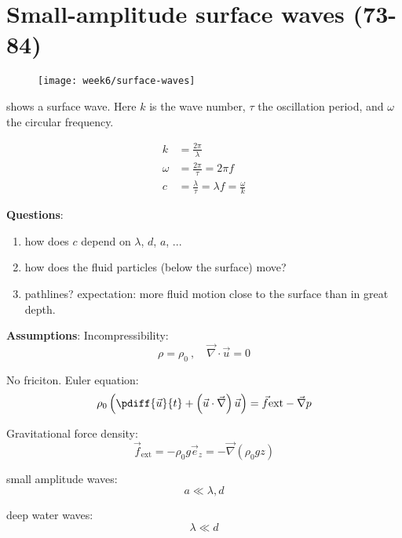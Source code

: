 \section{Small-amplitude surface waves (73-84)}

\begin{figure}[!h]
    \centering
    \texttt{[image: week6/surface-waves]}\\
    \caption{}
    \label{fig:surface-waves}
\end{figure}

 shows a surface wave. Here $k$ is the wave number, $\tau$ the oscillation period, and $\omega$ the circular frequency.

\begin{align}
k &= \frac{2\pi}{\lambda}\\
\omega &= \frac{2\pi}{\tau} = 2\pi f\\
c &= \frac{\lambda}{\tau} = \lambda f = \frac{\omega}{k}
\end{align}

\textbf{Questions}:
\begin{enumerate}
\item how does $c$ depend on $\lambda$, $d$, $a$, ...
\item how does the fluid particles (below the surface) move?
\item pathlines? expectation: more fluid motion close to the surface than in great depth.
\end{enumerate}

\textbf{Assumptions}:
Incompressibility:
\begin{equation}
\rho=\rho_0\ ,\quad \vec{\nabla}\cdot\vec{u}=0
\end{equation}

No friciton. Euler equation:
\begin{equation}
\rho_0\left(\pdiff{\vec{u}}{t}+\left(\vec{u}\cdot\vec{\nabla}\right)\vec{u}\right) = \vec{f}\mathrm{ext}-\vec{\nabla}p
\end{equation}

Gravitational force density:
\begin{equation}
\vec{f}_\mathrm{ext} = -\rho_0g\vec{e}_z = -\vec{\nabla}(\rho_0 gz)
\end{equation}

small amplitude waves:
\begin{equation}
a\ll \lambda,d
\end{equation}

deep water waves:
\begin{equation}
\lambda\ll d
\end{equation}

